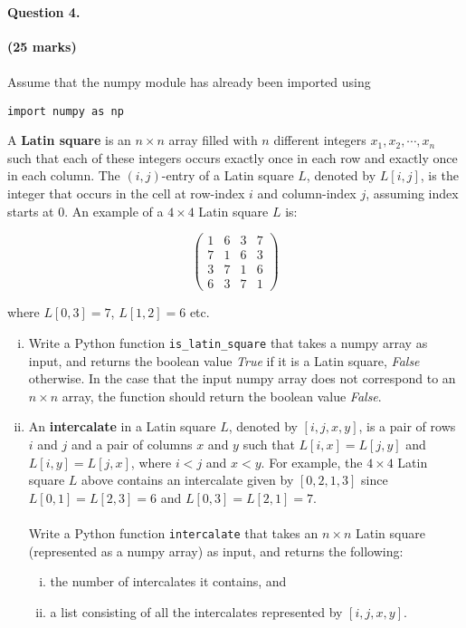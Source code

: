 \documentclass[12pt]{article}
\begin{document}
\paragraph{Question 4. }\hfill {\bf (25 marks)}\\\\
Assume that the numpy module has already been imported using
\begin{verbatim}
import numpy as np
\end{verbatim}
\noindent A \textbf{Latin square} is an $n\times n$ array filled with $n$ different integers $x_1,x_2,\cdots,x_n$ such that each of these integers occurs exactly once in each row and exactly once in each column. The $(i,j)$-entry of a Latin square $L$, denoted by $L[i,j]$, is the integer that occurs in the cell at row-index $i$ and column-index $j$, assuming index starts at 0. An example of a $4\times 4$ Latin square $L$ is:
{\par \centering
\[
\begin{pmatrix}
1&6&3&7\\7&1&6&3\\3&7&1&6\\6&3&7&1
\end{pmatrix}
\]
}
where $L[0,3]=7$, $L[1,2]=6$ etc.
\begin{enumerate}[(i)]
\item Write a Python function \verb|is_latin_square| that takes a numpy array as input, and returns the boolean value \textit{True} if it is a Latin square, \textit{False} otherwise. In the case that the input numpy array does not correspond to an $n\times n$ array, the function should return the boolean value \textit{False}.
\item An \textbf{intercalate} in a Latin square $L$, denoted by $[i,j,x,y]$, is a pair of rows $i$ and $j$ and a pair of columns $x$ and $y$ such that $L[i,x]=L[j,y]$ and $L[i,y]=L[j,x]$, where $i<j$ and $x<y$. For example, the $4\times 4$ Latin square $L$ above contains an intercalate given by $[0,2,1,3]$ since $L[0,1]=L[2,3]=6$ and $L[0,3]=L[2,1]=7$.\\\\Write a Python function \verb|intercalate| that takes an $n\times n$ Latin square (represented as a numpy array) as input, and returns the following:
\begin{enumerate}[(i)]
\item the number of intercalates it contains, and
\item a list consisting of all the intercalates represented by $[i,j,x,y]$.
\end{enumerate}
\end{enumerate}
\end{document}
